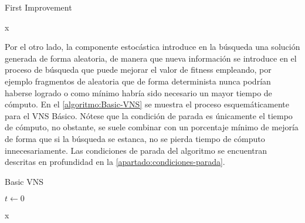 \begin{algorithm}[htbp]
	\caption{First Improvement}
	\label{algoritmo:FirstImprovement}
	
	\DontPrintSemicolon
	\medskip
	
	\Return x \;
	
\end{algorithm}

Por el otro lado, la componente estocástica introduce en la búsqueda una solución generada de forma aleatoria, de manera que nueva información se introduce en el proceso de búsqueda que puede mejorar el valor de fitness empleando, por ejemplo fragmentos de aleatoria que de forma determinista nunca podrían haberse logrado o como mínimo habría sido necesario un mayor tiempo de cómputo. En el \autoref{algoritmo:Basic-VNS} se muestra el proceso esquemáticamente para el VNS Básico. Nótese que la condición de parada es únicamente el tiempo de cómputo, no obstante, se suele combinar con un porcentaje mínimo de mejoría de forma que si la búsqueda se estanca, no se pierda tiempo de cómputo innecesariamente. Las condiciones de parada del algoritmo se encuentran descritas en profundidad en la \autoref{apartado:condiciones-parada}.

\begin{algorithm}[htbp]
	\caption{Basic VNS~\cite{vns}}
	\label{algoritmo:Basic-VNS}
	
	\DontPrintSemicolon

	\bigskip
	
	$t \leftarrow 0$ \;
	

	\Return x \;
	
\end{algorithm}

